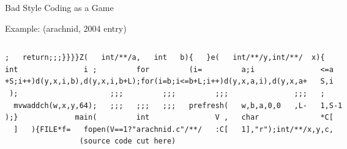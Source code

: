 \begin{frame}[fragile]{Bad Style Coding as a Game}
\begin{block}{Example: 
      {\normalsize (arachnid, 2004 entry)}}
\begin{columns}
\begin{column}{.6\linewidth}
{\begin{Verbatim}[fontsize=\tiny]
  ;   return;;;}}}}Z(   int/**/a,   int   b){   }e(   int/**/y,int/**/  x){
int               i ;         for         (i=         a;i               <=a
+S;i++)d(y,x,i,b),d(y,x,i,b+L);for(i=b;i<=b+L;i++)d(y,x,a,i),d(y,x,a+   S,i
 );                     ;;;         ;;;         ;;;               ;;;   ;
  mvwaddch(w,x,y,64);   ;;;   ;;;   ;;;   prefresh(   w,b,a,0,0   ,L-   1,S-1
);}             main(         int               V ,   char              *C[
  ]   ){FILE*f=   fopen(V==1?"arachnid.c"/**/   :C[   1],"r");int/**/x,y,c,
                 (source code cut here)
    \end{Verbatim}
  }%
      \end{column}
      \begin{column}{.4\linewidth}%
      \end{column}
    \end{columns}

  \end{block}
\end{frame}
